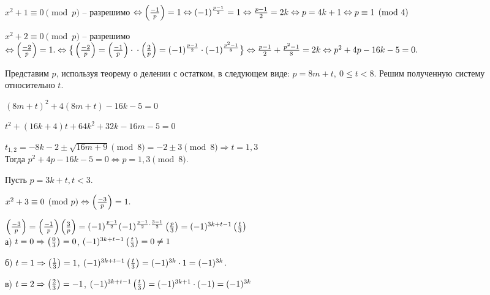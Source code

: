 
$x^2 + 1 \equiv 0 \pmod p $ -- разрешимо $ \Leftrightarrow \left( \frac{-1}{p} \right) = 1 \Leftrightarrow (-1)^{\frac{p-1}{2}} = 1 \\ \Leftrightarrow \frac{p-1}{2} = 2k \Leftrightarrow p = 4k + 1 \Leftrightarrow p \equiv 1 \pmod 4$


$x^2 + 2 \equiv 0 \pmod p $ -- разрешимо $ \Leftrightarrow \left( \frac{-2}{p} \right) = 1. \Leftrightarrow \big \{ \left( \frac{-2}{p} \right) = \left( \frac{-1}{p} \right) \cdot \\ \cdot \left( \frac{2}{p} \right) = (-1)^{\frac{p-1}{2}} \cdot (-1)^{\frac{p^2-1}{8}} \big \} \Leftrightarrow \frac{p-1}{2} + \frac{p^2-1}{8} = 2k \Leftrightarrow p^2 + 4p - 16k - 5 = 0.$

Представим $p$, используя теорему о делении с остатком, в следующем виде: $p = 8m + t,\ 0 \le t < 8$. Решим полученную систему относительно $t$.

$(8m + t)^2 + 4(8m + t) - 16k -5 = 0$

$ t^2 + (16k + 4)t + 64k^2 + 32k - 16m - 5 = 0$

$t_{1, 2} = -8k - 2 \pm \sqrt{16m + 9} \pmod 8 = -2 \pm 3 \pmod 8 \Rightarrow t = 1,3$ \\

\noindent Тогда $p^2 + 4p - 16k - 5 = 0 \Leftrightarrow p = 1, 3 \pmod 8$.


Пусть $p = 3k + t, t < 3.$

$x^2 + 3 \equiv 0 \pmod p \Leftrightarrow \left( \frac{-3}{p} \right) = 1.$

$ \left( \frac{-3}{p} \right) = \left( \frac{-1}{p} \right) \left( \frac{3}{p} \right) = (-1)^{\frac{p-1}{2}}(-1)^{\frac{p-1}{2} \cdot \frac{3-1}{2}} \left( \frac{p}{3} \right) = (-1)^{3k + t -1} \left( \frac{t}{3} \right)$\\

а) $t = 0 \Rightarrow \left( \frac{0}{3} \right) = 0$, $(-1)^{3k + t -1} \left( \frac{t}{3} \right) = 0 \ne 1$

б) $t = 1 \Rightarrow \left( \frac{1}{3} \right) = 1$, $(-1)^{3k + t -1} \left( \frac{t}{3} \right) = (-1)^{3k} \cdot 1 = (-1)^{3k}$.

в) $t = 2 \Rightarrow \left( \frac{2}{3} \right) = -1$, $(-1)^{3k + t -1} \left( \frac{t}{3} \right) = (-1)^{3k + 1} \cdot (-1) = (-1)^{3k}$ \\

